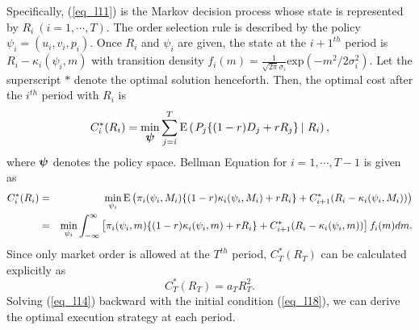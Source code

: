 Specifically, (\ref{eq_l11}) is the Markov decision process whose state is represented by $R_i\ (i=1,\cdots,T)$.  The order selection rule is described by the policy $\psi_i = (u_i, v_i, p_i)$.  Once $R_i$ and $\psi_i$ are given, the state at the $i+1^{th}$ period is $R_i-\kappa_i(\psi_i,m)$ with transition density ${\displaystyle f_i(m)=\frac{1}{\sqrt{2\pi}\sigma_i} \mbox{exp} (-m^2/2\sigma_i^2)}$.  Let the superscript $*$ denote the optimal solution henceforth.  Then, the optimal cost after the $i^{th}$ period with $R_i$ is
\begin{equation}\label{eq_l13}
  C_i^*(R_i) = \min_{\mbox{\boldmath $\psi$}} \sum_{j=i}^T {\mathrm{E}}\left( \left. P_j \{(1-r) D_j +r R_j\} \, \right| \, R_i \right),
\end{equation}
where $\mbox{\boldmath $\psi$}$ denotes the policy space.
Bellman Equation for $i=1,\cdots,T-1$ is given as
\begin{eqnarray}
  C_i^*(R_i)
   & = & \min_{\psi_i} {\mathrm{E}}\left(  \pi_i(\psi_i,M_i) \{(1-r) \kappa_i(\psi_i,M_i) + r R_i \}+ C_{i+1}^*(R_i-\kappa_i(\psi_i,M_i)) \right) \nonumber \\
   & = & \min_{\psi_i} \int_{-\infty}^\infty
         \left[ \pi_i(\psi_i,m) \{(1-r) \kappa_i(\psi_i,m) + r R_i \}+ C_{i+1}^*(R_i-\kappa_i(\psi_i,m)) \right] f_i(m) dm. \label{eq_l14}
\end{eqnarray}
Since only market order is allowed at the $T^{th}$ period, $C_T^*(R_T)$ can be calculated explicitly as
\begin{equation}\label{eq_l18}
  C_T^*(R_T)=a_T R_T^2.
\end{equation}
  Solving (\ref{eq_l14}) backward with the initial condition (\ref{eq_l18}), we can derive the optimal execution strategy at each period.

